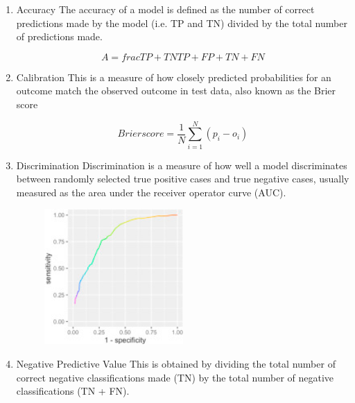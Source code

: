 \begin{enumerate}
    \item Accuracy \newline
    The accuracy of a model is defined as the number of correct predictions made by the model (i.e. TP and TN) divided by the total number of predictions made.
    
    \begin{equation}
        A = frac{TP + TN}{TP + FP + TN + FN}
    \end{equation}
    
    \item Calibration\newline
    This is a measure of how closely predicted probabilities for an outcome match the observed outcome in test data, also known as the Brier score
    
    \begin{equation}
        Brier score = \frac{1}{N} \sum_{i=1}^{N} (p_{i} - o_{i})
    \end{equation}
    
    \item{Discrimination}
    Discrimination is a measure of how well a model discriminates between randomly selected true positive cases and true negative cases, usually measured as the area under the receiver operator curve (AUC).
    
    \begin{figure}[H]
    \centering
    \includegraphics[width=0.5\textwidth]{ThesisTemplate/usingLatex/images/AUC.png}
    \end{figure}
    
    \item{Negative Predictive Value}
    This is obtained by dividing the total number of correct negative classifications made (TN) by the total number of negative classifications (TN + FN).
    

\end{enumerate}
